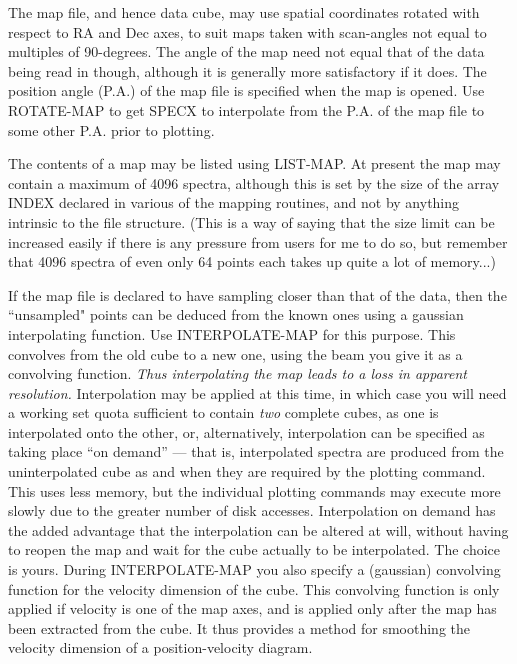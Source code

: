 \documentclass[11pt,twoside]{report}
\begin{document}
The map file, and hence data cube, may use spatial coordinates rotated with
respect to RA and Dec axes,  to suit maps taken
with scan-angles not equal to multiples of 90-degrees. The angle of the map
need not equal that of the data being read in though, although it is generally
more satisfactory if it does. The position angle (P.A.)  of the map file is specified when the map is opened. Use ROTATE-MAP to
get SPECX to interpolate from the P.A. of the map file to some other P.A. prior
to plotting. 

The contents of a map may be listed using LIST-MAP. At present the map may
contain a maximum of 4096 spectra,  although
this is set by the size of the array INDEX declared in various of the mapping
routines, and not by anything intrinsic to the file structure. (This is a way
of saying that the size limit can be increased easily if there is any pressure
from users for me to do so, but remember that 4096 spectra of even only 64
points each takes up quite a lot of memory...) 

If the map file is declared to have sampling closer than that of the data, then
the ``unsampled" points can be deduced from the known ones using a gaussian
interpolating function.  Use INTERPOLATE-MAP for this
purpose. This convolves from the old cube to a new one, using the beam you give
it as a convolving function. {\em Thus interpolating the map leads to a loss in
apparent resolution.} Interpolation may be applied at this time, in which case
you will need a working set quota sufficient to contain {\em two} complete
cubes, as one is interpolated onto the other, or, alternatively, interpolation
can be specified as taking place ``on demand'' --- that is, interpolated spectra
are produced from the uninterpolated cube as and when they are required by the
plotting command. This uses less memory, but the individual plotting commands
may execute more slowly due to the greater number of disk accesses.
Interpolation on demand has the added advantage that the interpolation can be
altered at will, without having to reopen the map and wait for the cube
actually to be interpolated. The choice is yours. During INTERPOLATE-MAP you
also specify a (gaussian) convolving function for the velocity dimension of the
cube. This convolving function is only applied if velocity is one of the map
axes, and is applied only after the map has been extracted from the cube. It
thus provides a method for smoothing the velocity dimension of a
position-velocity diagram. 
\end{document}
